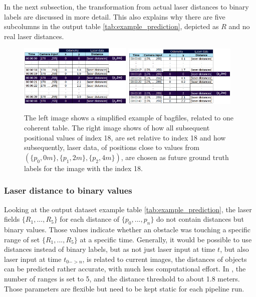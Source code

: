 In the next subsection, the transformation from actual laser distances to binary labels are discussed in more detail. This also explains why there are five subcolumns in the output table \ref{tab:example_prediction}, depicted as $R$ and no real laser distances.

\begin{figure}[h]%
\centering
\includegraphics[width=0.48\textwidth]{Bilder/positions.png} 
\hspace{0.2 cm}
\includegraphics[width=0.48\textwidth]{Bilder/relative_positions.png} 
\caption[]{The left image shows a simplified example of bagfiles, related to one coherent table. The right image shows of how all subsequent positional values of index 18, are set relative to index 18 and how subsequently, laser data, of positions close to values from $(\{p_{0},0m\},\{p_{1},2m\},\{p_{2},4m\})$, are chosen as future ground truth labels for the image with the index 18.}
\label{relative_positions}
\end{figure}

\subsubsection{Laser distance to binary values\label{laser_binary} }
Looking at the output dataset example table \ref{tab:example_prediction}, the laser fields $\{R_{1}, ... , R_{5}\}$ for each distance of $\{p_{0},...,p_{n}\}$ do not contain distances but binary values. Those values indicate whether an obstacle was touching a specific range of set $\{R_{1}, ... , R_{5}\}$ at a specific time. Generally, it would be possible to use distances instead of binary labels, but as not just laser input at time $t$, but also laser input at time $t_{0->n}$, is related to current images, the distances of objects can be predicted rather accurate, with much less computational effort. In , the number of ranges is set to 5, and the distance threshold to about 1.8 meters. Those parameters are flexible but need to be kept static for each pipeline run.\\

